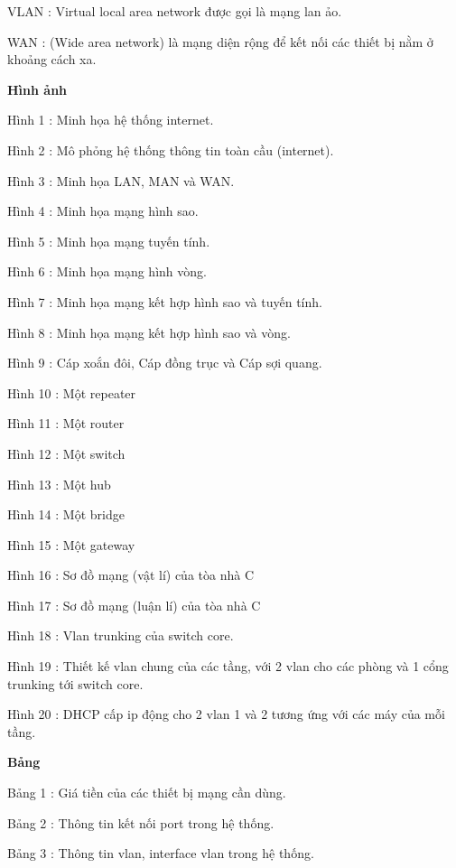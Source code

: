 \documentclass{report}
\begin{document}
\vspace{0.2cm}
VLAN : Virtual local area network được gọi là mạng lan ảo.

\vspace{0.2cm}
WAN : (Wide area network) là mạng diện rộng để kết nối các thiết bị nằm ở khoảng cách xa.


\vspace{1cm}
\changefontsizes{14pt}
\setlength{\parindent}{0.0cm}
\textbf{Hình ảnh}

\changefontsizes{13pt}
Hình 1 : Minh họa hệ thống internet.

Hình 2 : Mô phỏng hệ thống thông tin toàn cầu (internet).

Hình 3 : Minh họa LAN, MAN và WAN.

Hình 4 : Minh họa mạng hình sao.

Hình 5 : Minh họa mạng tuyến tính.

Hình 6 : Minh họa mạng hình vòng.

Hình 7 : Minh họa mạng kết hợp hình sao và tuyến tính.

Hình 8 : Minh họa mạng kết hợp hình sao và vòng.

Hình 9 : Cáp xoắn đôi, Cáp đồng trục và Cáp sợi quang.

Hình 10 : Một repeater

Hình 11 : Một router

Hình 12 : Một switch

Hình 13 : Một hub

Hình 14 : Một bridge

Hình 15 : Một gateway

Hình 16 : Sơ đồ mạng (vật lí) của tòa nhà C

Hình 17 : Sơ đồ mạng (luận lí) của tòa nhà C

Hình 18 : Vlan trunking của switch core.

Hình 19 : Thiết kế vlan chung của các tầng, với 2 vlan cho các phòng và 1 cổng trunking tới switch core.

Hình 20 : DHCP cấp ip động cho 2 vlan 1 và 2 tương ứng với các máy của mỗi tầng.


\bigskip
\changefontsizes{14pt}
\setlength{\parindent}{0.0cm}
\textbf{Bảng}

\changefontsizes{13pt}
Bảng 1 : Giá tiền của các thiết bị mạng cần dùng.

Bảng 2 : Thông tin kết nối port trong hệ thống.

Bảng 3 : Thông tin vlan, interface vlan trong hệ thống.
\end{document}
